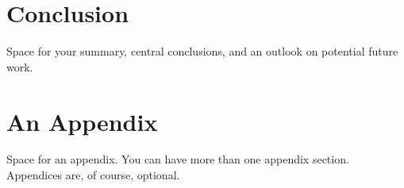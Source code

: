 \documentclass[a4paper,oneside,10pt,ngerman,english]{scrartcl}
\begin{document}
\section{Conclusion}
\label{sec:conclusion}

Space for your summary, central conclusions, and an outlook on potential future work.



\printbibliography

\appendix


\section{An Appendix}
\label{app:an-appendix}

Space for an appendix.
You can have more than one appendix section.
Appendices are, of course, optional.



\cleardoubleoddpage
\end{document}
